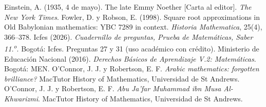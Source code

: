 \documentclass[11pt]{article}
\begin{document}
\autoevaluacion

\seguimientodocente

\begin{referencias}
 Einstein, A. (1935, 4 de mayo). The late Emmy Noether
  [Carta al editor]. \emph{The New York Times}.
 Fowler, D. y Robson, E. (1998). Square root approximations
  in Old Babylonian mathematics: YBC 7289 in context. \emph{Historia
  Mathematica}, 25(4), 366--378.
 Icfes (2026). \emph{Cuadernillo de preguntas, Prueba de
  Matemáticas, Saber 11.\textsuperscript{o}}. Bogotá: Icfes. Preguntas 27 y 31
  (uso académico con crédito).
 Ministerio de Educación Nacional (2016). \emph{Derechos
  Básicos de Aprendizaje V.2: Matemáticas}. Bogotá: MEN.
 O'Connor, J. J. y Robertson, E. F. \emph{Arabic
  mathematics: forgotten brilliance?} MacTutor History of Mathematics,
  Universidad de St Andrews.
 O'Connor, J. J. y Robertson, E. F.
  \emph{Abu Ja'far Muhammad ibn Musa Al-Khwarizmi}. MacTutor History of
  Mathematics, Universidad de St Andrews.

\end{referencias}
\end{document}
